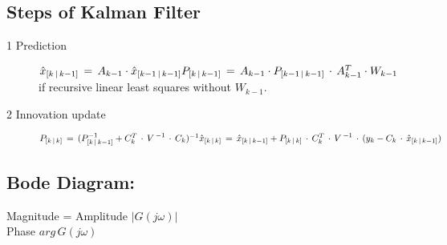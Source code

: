 \subsection*{Steps of Kalman Filter}
\begin{description}
\item[1 Prediction] $\hat { x } _{ [k\, |\, k-1] }\, =\, A_{ k-1 }\cdot \hat { x } _{ [k-1\, |\, k-1] }\\ P_{ [k\, |\, k-1] }\, =\, A_{ k-1 }\cdot { P }_{ [k-1\, |\, k-1] }\, \cdot \, A_{ k-1 }^{ T }\cdot { W }_{ k-1 }$ \\
if recursive linear least squares without \( { W }_{ k-1 } \).
\item[2 Innovation update] $P_{ [k\, |\, k] }\, =\, (P_{ [k\, |\, k-1] }^{ -1 }+C_{ k }^{ T }\, \cdot \, { V\,  }^{ -1 }\, \cdot \, C_{ k })^{ -1 }\\ \hat { x } _{ [k\, |\, k] }\, =\, \hat { x } _{ [k\, |\, k-1] }+P_{ [k\, |\, k] }\, \cdot \, C_{ k }^{ T }\, \cdot \, { V\,  }^{ -1 }\, \cdot \, (y_{ k }-C_{ k }\, \cdot \, \hat { x } _{ [k\, |\, k-1] })$
\end{description}

\subsection*{Bode Diagram:}
Magnitude = Amplitude $|G(j\omega)|$\\
Phase $arg \, G(j\omega)$